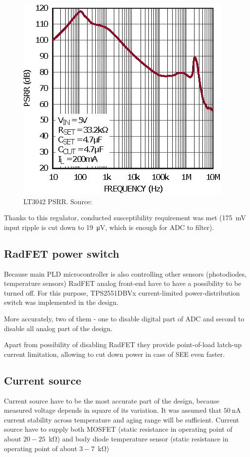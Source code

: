         \begin{figure}[H]
            \centering
            \includegraphics[width=0.4\paperwidth]{img/06/LT3042_PSRR.eps}
            \caption{LT3042 PSRR. Source: \cite{LT3042_datasheet}}
            \label{LT3042_PSRR}
        \end{figure}

        Thanks to this regulator, conducted susceptibility requirement was met (\SI{175}{\mV} input ripple is cut down to \SI{19}{\uV}, which is enough for ADC to filter).

    \subsection{RadFET power switch}
        Because main PLD microcontroller is also controlling other sensors (photodiodes, temperature sensors) RadFET analog front-end have to have a possibility to be turned off. For this purpose, TPS2551DBVx current-limited power-distribution switch was implemented in the design.

        More accurately, two of them - one to disable digital part of ADC and second to disable all analog part of the design.

        Apart from possibility of disabling RadFET they provide point-of-load latch-up current limitation, allowing to cut down power in case of SEE even faster.

    \subsection{Current source}
        Current source have to be the most accurate part of the design, because measured voltage depends in square of its variation. It was assumed that $\SI{50}{\nano\ampere}$ current stability across temperature and aging range will be sufficient. Current source have to supply both MOSFET (static resistance in operating point of about $20-25$~\si{\kilo\ohm}) and body diode temperature sensor (static resistance in operating point of about     $3-7$~\si{\kilo\ohm})

